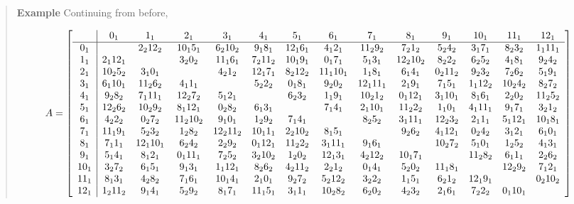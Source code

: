 \documentclass[
  11pt,
  a4paper]{book}
\newcounter{examplecounter}
\begin{document}
\begin{quote}  \textbf{Example } \quad 
Continuing from before,

\begin{equation}
A = \left[\begin{array}{c|*{13}c}
 & 0_1 & 1_1 & 2_1 & 3_1 & 4_1 & 5_1 & 6_1 & 7_1 & 8_1 & 9_1 & 10_1 & 11_1 & 12_1\\ \hline
0_1 &  & 2_2 12_2 & 10_1 5_1 & 6_2 10_2 & 9_1 8_1 & 12_1 6_1 & 4_1 2_1 & 11_2 9_2 & 7_2 1_2 & 5_2 4_2 & 3_1 7_1 & 8_2 3_2 & 1_1 11_1\\
1_1 & 2_1 12_1 & & 3_2 0_2 & 11_1 6_1 & 7_2 11_2 & 10_1 9_1 & 0_1 7_1 & 5_1 3_1 & 12_2 10_2 & 8_2 2_2 & 6_2 5_2 & 4_1 8_1 & 9_2 4_2\\
2_1 & 10_2 5_2 & 3_1 0_1 & & 4_2 1_2 & 12_1 7_1 & 8_2 12_2 & 11_1 10_1 & 1_1 8_1 & 6_1 4_1 & 0_2 11_2 & 9_2 3_2 & 7_2 6_2 & 5_1 9_1\\
3_1 & 6_1 10_1 & 11_2 6_2 & 4_1 1_1 & & 5_2 2_2 & 0_1 8_1 & 9_2 0_2 & 12_1 11_1 & 2_1 9_1 & 7_1 5_1 & 1_1 12_2 & 10_2 4_2 & 8_2 7_2\\
4_1 & 9_2 8_2 & 7_1 11_1 & 12_2 7_2 & 5_1 2_1 & & 6_2 3_2 & 1_1 9_1 & 10_2 1_2 & 0_1 12_1 & 3_1 10_1 & 8_1 6_1 & 2_2 0_2 & 11_2 5_2\\
5_1 & 12_2 6_2 & 10_2 9_2 & 8_1 12_1 & 0_2 8_2 & 6_1 3_1 & & 7_1 4_1 & 2_1 10_1 & 11_2 2_2 & 1_1 0_1 & 4_1 11_1 & 9_1 7_1 & 3_2 1_2\\
6_1 & 4_2 2_2 & 0_2 7_2 & 11_2 10_2 & 9_1 0_1 & 1_2 9_2 & 7_1 4_1 & & 8_2 5_2 & 3_1 11_1 & 12_2 3_2 & 2_1 1_1 & 5_1 12_1 & 10_1 8_1\\
7_1 & 11_1 9_1 & 5_2 3_2 & 1_2 8_2 & 12_2 11_2 & 10_1 1_1 & 2_2 10_2 & 8_1 5_1 & & 9_2 6_2 & 4_1 12_1 & 0_2 4_2 & 3_1 2_1 & 6_1 0_1\\
8_1 & 7_1 1_1 & 12_1 10_1 & 6_2 4_2 & 2_2 9_2 & 0_1 12_1 & 11_2 2_2 & 3_1 11_1 & 9_1 6_1 & & 10_2 7_2 & 5_1 0_1 & 1_2 5_2 & 4_1 3_1\\
9_1 & 5_1 4_1 & 8_1 2_1 & 0_1 11_1 & 7_2 5_2 & 3_2 10_2 & 1_2 0_2 & 12_1 3_1 & 4_2 12_2 & 10_1 7_1 & & 11_2 8_2 & 6_1 1_1 & 2_2 6_2\\
10_1 & 3_2 7_2 & 6_1 5_1 & 9_1 3_1 & 1_1 12_1 & 8_2 6_2 & 4_2 11_2 & 2_2 1_2 & 0_1 4_1 & 5_2 0_2 & 11_1 8_1 & & 12_2 9_2 & 7_1 2_1\\
11_1 & 8_1 3_1 & 4_2 8_2 & 7_1 6_1 & 10_1 4_1 & 2_1 0_1 & 9_2 7_2 & 5_2 12_2 & 3_2 2_2 & 1_1 5_1 & 6_2 1_2  & 12_1 9_1 & & 0_2 10_2\\
12_1 & 1_2 11_2 & 9_1 4_1 & 5_2 9_2 & 8_1 7_1 & 11_1 5_1 & 3_1 1_1 & 10_2 8_2 & 6_2 0_2 & 4_2 3_2 & 2_1 6_1 & 7_2 2_2 & 0_1 10_1 & \\
\end{array}\right]
\end{equation}


\end{quote}
\end{document}
